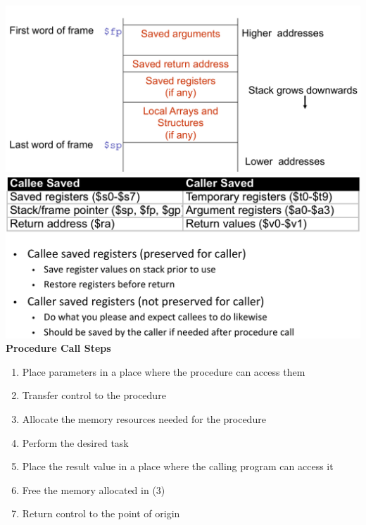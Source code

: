 \includegraphics[width=\linewidth]{png/stack.png}
\includegraphics[width=\linewidth]{png/save.png}
\textbf{Procedure Call Steps}
\begin{enumerate}
\item Place parameters in a place where the procedure can access them
\item Transfer control to the procedure
\item Allocate the memory resources needed for the procedure
\item Perform the desired task
\item Place the result value in a place where the calling program can access it
\item Free the memory allocated in (3)
\item Return control to the point of origin
\end{enumerate}
